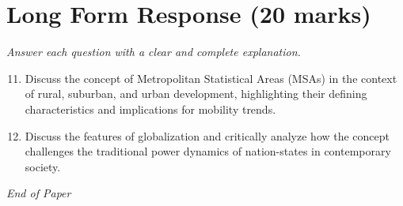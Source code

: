 \documentclass[12pt]{article}
\begin{document}
\section*{Long Form Response (20 marks)}
\textit{Answer each question with a clear and complete explanation.}
\begin{enumerate}[label=\arabic*.]
\setcounter{enumi}{10}
\item Discuss the concept of Metropolitan Statistical Areas (MSAs) in the context of rural, suburban, and urban development, highlighting their defining characteristics and implications for mobility trends.
\item Discuss the features of globalization and critically analyze how the concept challenges the traditional power dynamics of nation-states in contemporary society.
\end{enumerate}

\vfill
\noindent\textit{End of Paper}
\end{document}
